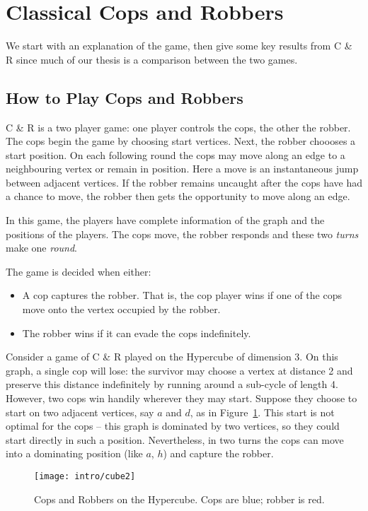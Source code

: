 \section{Classical Cops and Robbers}

We start with an explanation of the game, then give some key results from C \& R since much of our thesis is a comparison between the two games.

\subsection{How to Play Cops and Robbers}

C \& R is a two player game: one player controls the cops, the other the robber.
The cops begin the game by choosing start vertices. Next, the robber choooses a start position.
On each following round the cops may move along an edge to a neighbouring vertex
or remain in position.
Here a move is an instantaneous jump between adjacent vertices.
If the robber remains uncaught after the cops have had a chance to move, the
robber then gets the opportunity to move along an edge.

In this game, the players have complete information of the graph and the positions of the players.
The cops move, the robber responds and these two \textit{turns} make one \textit{round}.

The game is decided when either:
\begin{itemize}
\item A cop captures the robber. That is, the cop player wins if one of the cops move onto the vertex
occupied by the robber.
\item The robber wins if it can evade the cops indefinitely.
\end{itemize}

Consider a game of C \& R played on the Hypercube of dimension 3. On this graph, a single cop will lose: the survivor may choose a vertex at distance 2 and preserve this distance indefinitely by running around a sub-cycle of length 4. However, two cops win handily wherever they may start. Suppose they choose to start on two adjacent vertices, say $a$ and $d$, as in Figure~\ref{fig:hyper-cube2}. This start is not optimal for the cops -- this graph is dominated by two vertices, so they could start directly in such a position. Nevertheless, in two turns the cops can move into a dominating position (like $a$, $h$) and capture the robber.

\begin{figure}
\centering
\texttt{[image: intro/cube2]}
\caption{Cops and Robbers on the Hypercube. Cops are blue; robber is red. \label{fig:hyper-cube2}}
\end{figure}

